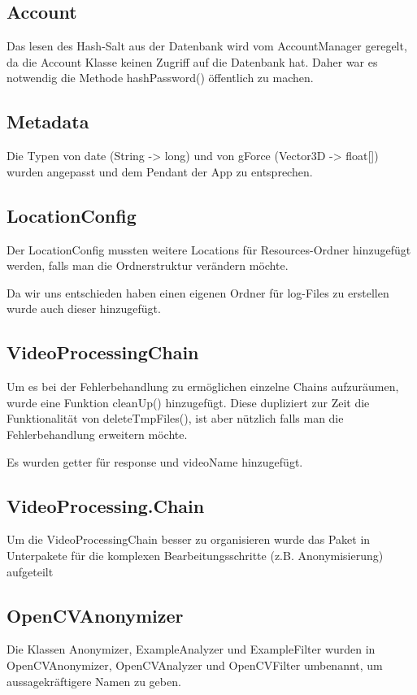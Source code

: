 \subsection{Account}
Das lesen des Hash-Salt aus der Datenbank wird vom AccountManager geregelt, da die Account Klasse keinen Zugriff auf die Datenbank hat. Daher war es notwendig die Methode hashPassword() öffentlich zu machen.

\subsection{Metadata}
Die Typen von date (String -> long) und von gForce (Vector3D -> float[]) wurden angepasst und dem Pendant der App zu entsprechen.

\subsection{LocationConfig}
Der LocationConfig mussten weitere Locations für Resources-Ordner hinzugefügt werden, falls man die Ordnerstruktur verändern möchte. \par
Da wir uns entschieden haben einen eigenen Ordner für log-Files zu erstellen wurde auch dieser hinzugefügt.

\subsection{VideoProcessingChain}
Um es bei der Fehlerbehandlung zu ermöglichen einzelne Chains aufzuräumen, wurde eine Funktion cleanUp() hinzugefügt. Diese dupliziert zur Zeit die Funktionalität von deleteTmpFiles(), ist aber nützlich falls man die Fehlerbehandlung erweitern möchte. \par 
Es wurden getter für response und videoName hinzugefügt.

\subsection{VideoProcessing.Chain}
Um die VideoProcessingChain besser zu organisieren wurde das Paket in Unterpakete für die komplexen Bearbeitungsschritte (z.B. Anonymisierung) aufgeteilt

\subsection{OpenCVAnonymizer}
Die Klassen Anonymizer, ExampleAnalyzer und ExampleFilter wurden in OpenCVAnonymizer, OpenCVAnalyzer und OpenCVFilter umbenannt, um aussagekräftigere Namen zu geben.

